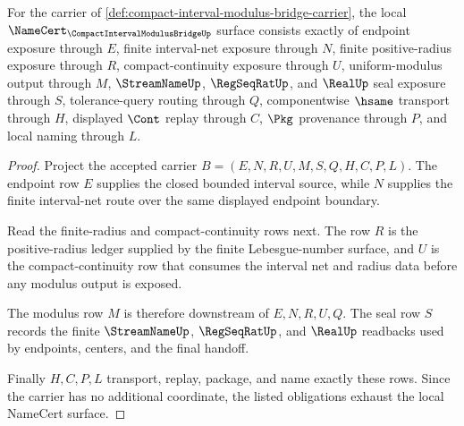 \begin{theorem}
\label{thm:compact-interval-modulus-bridge-namecert-obligations}
For the carrier of \autoref{def:compact-interval-modulus-bridge-carrier}, the local $\NameCert_{\CompactIntervalModulusBridgeUp}$ surface consists exactly of endpoint exposure through $E$, finite interval-net exposure through $N$, finite positive-radius exposure through $R$, compact-continuity exposure through $U$, uniform-modulus output through $M$, $\StreamNameUp$, $\RegSeqRatUp$, and $\RealUp$ seal exposure through $S$, tolerance-query routing through $Q$, componentwise $\hsame$ transport through $H$, displayed $\Cont$ replay through $C$, $\Pkg$ provenance through $P$, and local naming through $L$.
\end{theorem}
\begin{proof}
Project the accepted carrier $B=(E,N,R,U,M,S,Q,H,C,P,L)$. The endpoint row $E$ supplies the closed bounded interval source, while $N$ supplies the finite interval-net route over the same displayed endpoint boundary.

Read the finite-radius and compact-continuity rows next. The row $R$ is the positive-radius ledger supplied by the finite Lebesgue-number surface, and $U$ is the compact-continuity row that consumes the interval net and radius data before any modulus output is exposed.

The modulus row $M$ is therefore downstream of $E,N,R,U,Q$. The seal row $S$ records the finite $\StreamNameUp$, $\RegSeqRatUp$, and $\RealUp$ readbacks used by endpoints, centers, and the final handoff.

Finally $H,C,P,L$ transport, replay, package, and name exactly these rows. Since the carrier has no additional coordinate, the listed obligations exhaust the local NameCert surface.
\end{proof}



